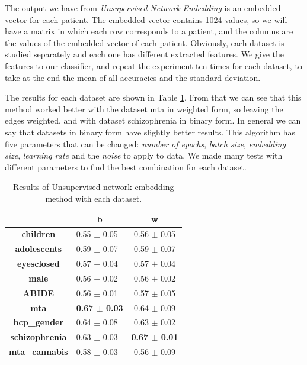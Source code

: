 The output we have from \textit{Unsupervised Network Embedding} is an embedded vector for each patient. The embedded vector contains 1024 values, so we will have a matrix in which each row corresponds to a patient, and the columns are the values of the embedded vector of each patient. Obviously, each dataset is studied separately and each one has different extracted features. We give the features to our classifier, and repeat the experiment ten times for each dataset, to take at the end the mean of all accuracies and the standard deviation.
\vspace{0.5cm}

The results for each dataset are shown in Table \ref{tab:embs}. From that we can see that this method worked better with the dataset mta in weighted form, so leaving the edges weighted, and with dataset schizophrenia in binary form. In general we can say that datasets in binary form have slightly better results. This algorithm has five parameters that can be changed: \textit{number of epochs}, \textit{batch size}, \textit{embedding size}, \textit{learning rate} and the \textit{noise} to apply to data. We made many tests with different parameters to find the best combination for each dataset.
\vspace{0.5cm}

\begin{table}
	\centering
	\begin{tabular}{c|l|c} 
		\toprule
		& \multicolumn{1}{c|}{b} & w                \\ 
		\midrule
		\textbf{children}      & 0.55 $\pm$ 0.05        & 0.56 $\pm$ 0.05  \\
		\textbf{adolescents}   & 0.59 $\pm$ 0.07        & 0.59 $\pm$ 0.07  \\
		\textbf{eyesclosed}    & 0.57 $\pm$ 0.04        & 0.57 $\pm$ 0.04  \\
		\textbf{male}          & 0.56 $\pm$ 0.02        & 0.56 $\pm$ 0.02  \\
		\textbf{ABIDE}         & 0.56 $\pm$ 0.01        & 0.57 $\pm$ 0.05  \\
		\textbf{mta}           & \textbf{0.67 $\pm$ 0.03}        & 0.64 $\pm$ 0.09  \\
		\textbf{hcp\_gender}   & 0.64 $\pm$ 0.08        & 0.63 $\pm$ 0.02  \\
		\textbf{schizophrenia} & 0.63 $\pm$ 0.03        & \textbf{0.67 $\pm$ 0.01}  \\
		\textbf{mta\_cannabis} & 0.58 $\pm$ 0.03        & 0.56 $\pm$ 0.09 
	\end{tabular}
	\caption{Results of Unsupervised network embedding method with each dataset.}
	\label{tab:embs}
\end{table}

